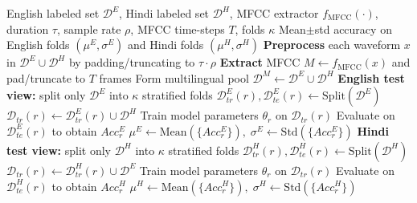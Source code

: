 \documentclass[runningheads]{llncs}
\begin{document}
\begin{algorithm}[h]
\caption{Algorithm $\Gamma$: Multilingual MFCC-SER training and evaluation}
\label{alg:gamma}
\begin{algorithmic}[1]
\Require English labeled set $\mathcal{D}^{E}$, Hindi labeled set $\mathcal{D}^{H}$, MFCC extractor $f_{\mathrm{MFCC}}(\cdot)$, duration $\tau$, sample rate $\rho$, MFCC time-steps $T$, folds $\kappa$
\Ensure Mean$\pm$std accuracy on English folds $(\mu^{E},\sigma^{E})$ and Hindi folds $(\mu^{H},\sigma^{H})$
\State \textbf{Preprocess} each waveform $x$ in $\mathcal{D}^{E}\cup\mathcal{D}^{H}$ by padding/truncating to $\tau\cdot\rho$
\State \textbf{Extract} MFCC $M \leftarrow f_{\mathrm{MFCC}}(x)$ and pad/truncate to $T$ frames
\State Form multilingual pool $\mathcal{D}^{M}\leftarrow \mathcal{D}^{E}\cup\mathcal{D}^{H}$
\Statex
\State \textbf{English test view:} split only $\mathcal{D}^{E}$ into $\kappa$ stratified folds
  \State $\mathcal{D}^{E}_{tr}(r),\mathcal{D}^{E}_{te}(r)\leftarrow \text{Split}(\mathcal{D}^{E})$
  \State $\mathcal{D}_{tr}(r)\leftarrow \mathcal{D}^{E}_{tr}(r)\cup \mathcal{D}^{H}$
  \State Train model parameters $\theta_{r}$ on $\mathcal{D}_{tr}(r)$
  \State Evaluate on $\mathcal{D}^{E}_{te}(r)$ to obtain $Acc^{E}_{r}$
\EndFor
\State $\mu^{E}\leftarrow \mathrm{Mean}(\{Acc^{E}_{r}\}),\;\sigma^{E}\leftarrow \mathrm{Std}(\{Acc^{E}_{r}\})$
\Statex
\State \textbf{Hindi test view:} split only $\mathcal{D}^{H}$ into $\kappa$ stratified folds
  \State $\mathcal{D}^{H}_{tr}(r),\mathcal{D}^{H}_{te}(r)\leftarrow \text{Split}(\mathcal{D}^{H})$
  \State $\mathcal{D}_{tr}(r)\leftarrow \mathcal{D}^{H}_{tr}(r)\cup \mathcal{D}^{E}$
  \State Train model parameters $\theta_{r}$ on $\mathcal{D}_{tr}(r)$
  \State Evaluate on $\mathcal{D}^{H}_{te}(r)$ to obtain $Acc^{H}_{r}$
\EndFor
\State $\mu^{H}\leftarrow \mathrm{Mean}(\{Acc^{H}_{r}\}),\;\sigma^{H}\leftarrow \mathrm{Std}(\{Acc^{H}_{r}\})$
\end{algorithmic}
\end{algorithm}
\end{document}
